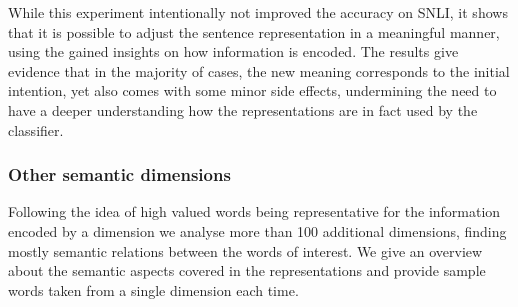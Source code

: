 \noindent
While this experiment intentionally not improved the accuracy on \ac{SNLI}, it shows that it is possible to adjust the sentence representation in a meaningful manner, using the gained insights on how information is encoded. The results give evidence that in the majority of cases, the new meaning corresponds to the initial intention, yet also comes with some minor side effects, undermining the need to have a deeper understanding how the representations are in fact used by the classifier. 
\subsubsection{Other semantic dimensions}
Following the idea of high valued words being representative for the information encoded by a dimension we analyse more than 100 additional dimensions, finding mostly semantic relations between the words of interest. We give an overview about the semantic aspects covered in the representations and provide sample words taken from a single dimension each time.
